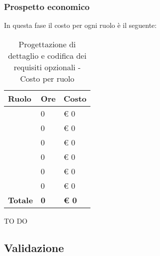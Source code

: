 		\subsubsection{Prospetto economico} %
		\label{ssub:prospetto_economico}
		In questa fase il costo per ogni ruolo è il seguente: \\
				\begin{table}[!h]
					\begin{center}
						\begin{tabularx}{0.6\textwidth}{|l|l|X|}
							\hline
							\textbf{Ruolo} & \textbf{Ore} & \textbf{Costo} \\
							\hline
							\roleProjectManager & 0 & \euro{} 0 \\
							\hline
							\roleAnalyst & 0 & \euro{} 0 \\
							\hline
							\roleDesigner & 0 & \euro{} 0 \\
							\hline
							\roleAdministrator & 0 & \euro{} 0 \\
							\hline
							\roleProgrammer & 0 & \euro{} 0 \\
							\hline
							\roleVerifier & 0 & \euro{} 0 \\
							\hline
							\textbf{Totale} & \textbf{0} & \textbf{\euro{} 0} \\
							\hline
						\end{tabularx}
					\end{center}
				\caption{Progettazione di dettaglio e codifica dei requisiti opzionali - Costo per ruolo}
				\end{table}

			\noindent
			TO DO
		
	
	\subsection{Validazione} %
	\label{sub:validazione}
